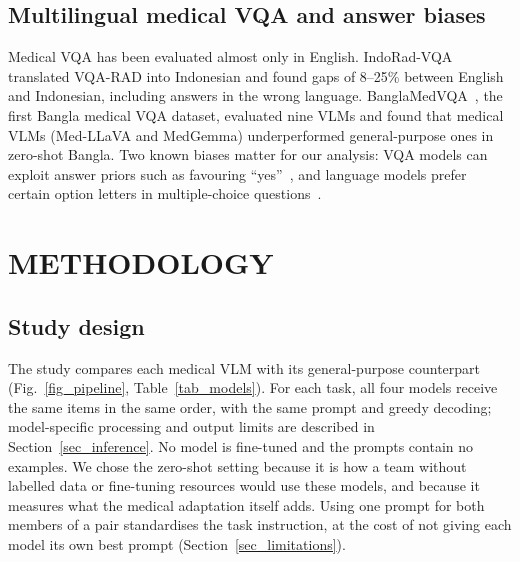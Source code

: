 \documentclass[doublecolumn]{ijcvsplatex}
\begin{document}
\subsection{Multilingual medical VQA and answer biases}
Medical VQA has been evaluated almost only in English. IndoRad-VQA~\cite{indoradvqa2026} translated VQA-RAD into Indonesian and found gaps of 8--25\% between English and Indonesian, including answers in the wrong language. BanglaMedVQA~\cite{ahmed2026banglamedvqa}, the first Bangla medical VQA dataset, evaluated nine VLMs and found that medical VLMs (Med-LLaVA and MedGemma) underperformed general-purpose ones in zero-shot Bangla. Two known biases matter for our analysis: VQA models can exploit answer priors such as favouring ``yes''~\cite{goyal2017vqav2}, and language models prefer certain option letters in multiple-choice questions~\cite{zheng2024mcqbias}.


\section{METHODOLOGY}
\label{sec_method}

\subsection{Study design}
The study compares each medical VLM with its general-purpose counterpart (Fig.~\ref{fig_pipeline}, Table~\ref{tab_models}). For each task, all four models receive the same items in the same order, with the same prompt and greedy decoding; model-specific processing and output limits are described in Section~\ref{sec_inference}. No model is fine-tuned and the prompts contain no examples. We chose the zero-shot setting because it is how a team without labelled data or fine-tuning resources would use these models, and because it measures what the medical adaptation itself adds. Using one prompt for both members of a pair standardises the task instruction, at the cost of not giving each model its own best prompt (Section~\ref{sec_limitations}).
\end{document}
